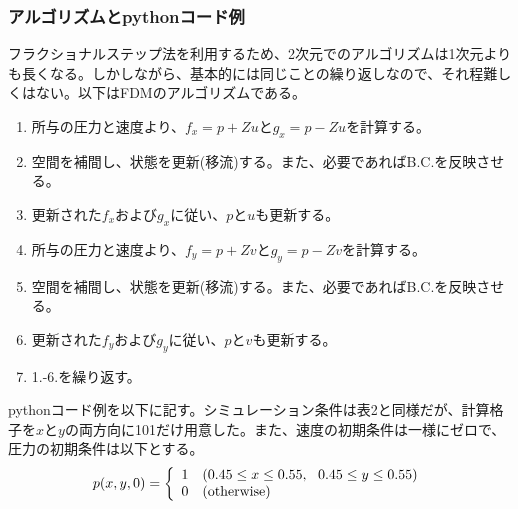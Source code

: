 \documentclass[dvipdfmx, 9pt, a4paper]{jsarticle}
\begin{document}
\subsubsection{アルゴリズムとpythonコード例}
フラクショナルステップ法を利用するため、2次元でのアルゴリズムは1次元よりも長くなる。しかしながら、基本的には同じことの繰り返しなので、それ程難しくはない。以下はFDMのアルゴリズムである。

\begin{tcolorbox}[title=FDMによる2次元移流方程式の求解]
\begin{enumerate}
\item 所与の圧力と速度より、$f_x=p+Zu$と$g_x=p-Zu$を計算する。
\item 空間を補間し、状態を更新(移流)する。また、必要であればB.C.を反映させる。
\item 更新された$f_x$および$g_x$に従い、$p$と$u$も更新する。
\item 所与の圧力と速度より、$f_y=p+Zv$と$g_y=p-Zv$を計算する。
\item 空間を補間し、状態を更新(移流)する。また、必要であればB.C.を反映させる。
\item 更新された$f_y$および$g_y$に従い、$p$と$v$も更新する。
\item 1.-6.を繰り返す。
\end{enumerate}
\end{tcolorbox}
pythonコード例を以下に記す。シミュレーション条件は表2と同様だが、計算格子を$x$と$y$の両方向に101だけ用意した。また、速度の初期条件は一様にゼロで、圧力の初期条件は以下とする。
\begin{equation}
p(x, y, 0)=
\left\{
\begin{array}{ll}
1 & (0.45 \leq x \leq 0.55,~~0.45 \leq y \leq 0.55) \\
0 & ({\rm otherwise})
\end{array}
\right. \notag
\end{equation}
\end{document}
